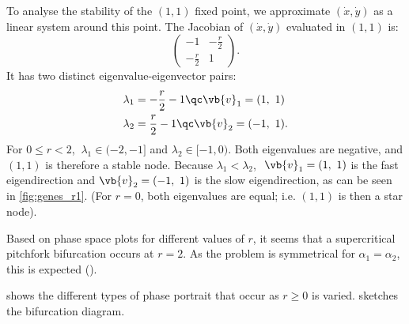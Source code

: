To analyse the stability of the $(1,1)$ fixed point, we approximate $(\dot{x}, \dot{y})$ as a linear system around this point. The Jacobian of $(\dot{x}, \dot{y})$ evaluated in $(1,1)$ is:
\[
\begin{pmatrix}
-1 & -\frac{r}{2}  \\
-\frac{r}{2} & 1
\end{pmatrix}.
\]
It has two distinct eigenvalue-eigenvector pairs:
%
\begin{align*}
\lambda_1 &= -\frac{r}{2} - 1   \qc \vb{v}_1 = (1,\ 1)  \\
\lambda_2 &= \frac{r}{2} - 1    \qc \vb{v}_2 = (-1,\ 1).
\end{align*}
%
For $0 \leq r < 2$, $\ \lambda_1 \in (-2, -1]$ and $\lambda_2 \in [-1, 0)$. Both eigenvalues are negative, and $(1,1)$ is therefore a stable node. Because $\lambda_1 < \lambda_2$, $\ \vb{v}_1 = (1,\ 1)$ is the fast eigendirection and $\vb{v}_2 = (-1,\ 1)$ is the slow eigendirection, as can be seen in \cref{fig:genes_r1}. (For $r = 0$, both eigenvalues are equal; i.e. $(1,1)$ is then a star node).

Based on phase space plots for different values of $r$, it seems that a supercritical pitchfork bifurcation occurs at $r = 2$. As the problem is symmetrical for $\alpha_1 = \alpha_2$, this is expected ().

 shows the different types of phase portrait that occur as $r \ge 0$ is varied.  sketches the bifurcation diagram.

\begin{figure}
\label{fig:gene_phases}
\end{figure}

\begin{figure}
\label{fig:gene_bifurc}
\end{figure}
